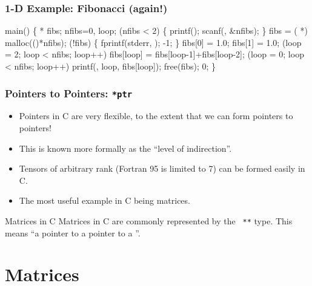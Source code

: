 \documentclass[smaller,table]{beamer}
\begin{document}
\begin{frame}[fragile]
\frametitle{1-D Example: Fibonacci (again!)}
\begin{semiverbatim}
\tiny
\kr\kl{} 
\kl{} 
\kl
\kl{} main()
\kl\{
\kl   {} * fibs;
\kl   {} nfibs=0, loop;
\kl   {} (nfibs < 2)
\kl   \{
\kl      printf();
\kl      scanf(, \&nfibs);
\kl   \}
\kl   
\kl   fibs = ( *) malloc(()*nfibs);
\kl   {} (!fibs) 
\kl   \{
\kl      fprintf(stderr, );
\kl      {} -1;
\kl   \}       
\kl   
\kl   fibs[0] = 1.0; fibs[1] = 1.0;
\kl   {} (loop = 2; loop < nfibs; loop++)
\kl      fibs[loop] = fibs[loop-1]+fibs[loop-2];
\kl      
\kl   {} (loop = 0; loop < nfibs; loop++)
\kl      printf(, loop, fibs[loop]);
\kl      
\kl   free(fibs);
\kl   {} 0;
\kl\}
\end{semiverbatim}
\end{frame}

\begin{frame}
\frametitle{Pointers to Pointers: {\tt **ptr}}
\begin{itemize}
\item Pointers in C are very flexible, to the extent that we can form pointers to pointers!
\item This is known more formally as the ``level of indirection''.
\item Tensors of arbitrary rank (Fortran 95 is limited to 7) can be formed easily in C.
\item The most useful example in C being matrices.
\end{itemize}
\begin{block}{Matrices in C}
Matrices in C are commonly represented by the {\tt {} **} type. This means ``a pointer to a pointer to a {\tt {}}''.
\end{block}
\end{frame}


\section{Matrices}
\end{document}
